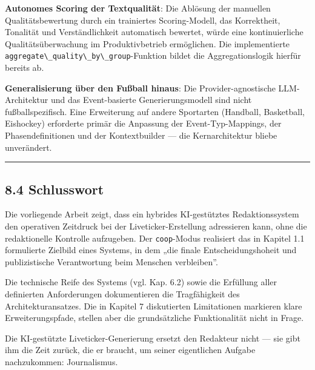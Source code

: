 \textbf{Autonomes Scoring der Textqualität}: Die Ablösung der manuellen
Qualitätsbewertung durch ein trainiertes Scoring-Modell, das
Korrektheit, Tonalität und Verständlichkeit automatisch bewertet, würde
eine kontinuierliche Qualitätsüberwachung im Produktivbetrieb
ermöglichen. Die implementierte
\passthrough{\lstinline!aggregate\_quality\_by\_group!}-Funktion bildet
die Aggregationslogik hierfür bereits ab.

\textbf{Generalisierung über den Fußball hinaus}: Die
Provider-agnostische LLM-Architektur und das Event-basierte
Generierungsmodell sind nicht fußballspezifisch. Eine Erweiterung auf
andere Sportarten (Handball, Basketball, Eishockey) erforderte primär
die Anpassung der Event-Typ-Mappings, der Phasendefinitionen und der
Kontextbuilder --- die Kernarchitektur bliebe unverändert.

\begin{center}\rule{0.5\linewidth}{0.5pt}\end{center}

\subsection{8.4 Schlusswort}\label{schlusswort}

Die vorliegende Arbeit zeigt, dass ein hybrides KI-gestütztes
Redaktionssystem den operativen Zeitdruck bei der Liveticker-Erstellung
adressieren kann, ohne die redaktionelle Kontrolle aufzugeben. Der
\passthrough{\lstinline!coop!}-Modus realisiert das in Kapitel 1.1
formulierte Zielbild eines Systems, in dem „die finale
Entscheidungshoheit und publizistische Verantwortung beim Menschen
verbleiben''.

Die technische Reife des Systems (vgl. Kap. 6.2) sowie die Erfüllung
aller definierten Anforderungen dokumentieren die Tragfähigkeit des
Architekturansatzes. Die in Kapitel 7 diskutierten Limitationen
markieren klare Erweiterungspfade, stellen aber die grundsätzliche
Funktionalität nicht in Frage.

Die KI-gestützte Liveticker-Generierung ersetzt den Redakteur nicht ---
sie gibt ihm die Zeit zurück, die er braucht, um seiner eigentlichen
Aufgabe nachzukommen: Journalismus.
